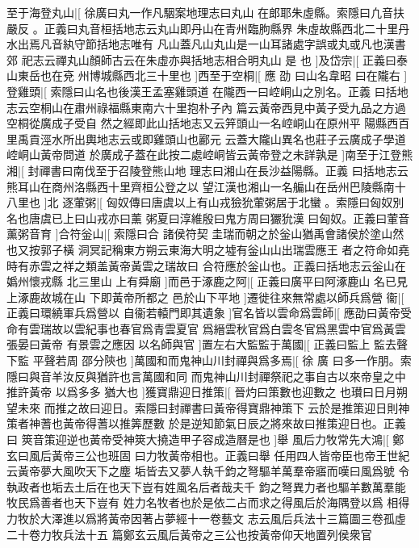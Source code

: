 %
至于海登丸山|[%
徐廣曰丸一作凡駰案地理志曰丸山%
在郎耶朱虛縣。索隱曰凢音扶嚴反%
%
。正義曰丸音桓括地志云丸山即丹山在青州臨朐縣界%
朱虛故縣西北二十里丹水出焉凡音紈守節括地志唯有%
%
凡山蓋凡山丸山是一山耳諸處字誤或丸或凡也漢書郊%
祀志云禪丸山顏師古云在朱虛亦與括地志相合明丸山%
是%
也%
]及岱宗|[%
正義曰泰山東岳也在兗%
州博城縣西北三十里也%
]西至于空桐|[%
應%
劭%
%
曰山名韋昭%
曰在隴右%
]登雞頭|[%
索隱曰山名也後漢王孟塞雞頭道%
在隴西一曰崆峒山之別名。正義%
%
曰括地志云空桐山在肅州祿福縣東南六十里抱朴子內%
篇云黃帝西見中黃子受九品之方過空桐從廣成子受自%
%
然之經即此山括地志又云笄頭山一名崆峒山在原州平%
陽縣西百里禹貢涇水所出輿地志云或即雞頭山也酈元%
%
云蓋大隴山異名也莊子云廣成子學道崆峒山黃帝問道%
於廣成子蓋在此按二處崆峒皆云黃帝登之未詳孰是%
%
]南至于江登熊湘|[%
封禪書曰南伐至于召陵登熊山地%
理志曰湘山在長沙益陽縣。正義%
%
曰括地志云熊耳山在商州洛縣西十里齊桓公登之以%
望江漢也湘山一名艑山在岳州巴陵縣南十八里也%
]北%
%
逐葷粥|[%
匈奴傳曰唐虞以上有山戎獫狁葷粥居于北蠻%
。索隱曰匈奴別名也唐虞已上曰山戎亦曰薰%
%
粥夏曰淳維殷曰鬼方周曰玁狁漢%
曰匈奴。正義曰葷音薰粥音育%
]合符釡山|[%
索隱曰合%
諸侯符契%
%
圭瑞而朝之於釡山猶禹會諸侯於塗山然也又按郭子橫%
洞冥記稱東方朔云東海大明之墟有釡山山出瑞雲應王%
%
者之符命如堯時有赤雲之祥之類盖黃帝黃雲之瑞故曰%
合符應於釡山也。正義曰括地志云釡山在嬀州懷戎縣%
%
北三里山%
上有舜廟%
]而邑于涿鹿之阿|[%
正義曰廣平曰阿涿鹿山%
名已見上涿鹿故城在山%
%
下即黃帝所都之%
邑於山下平地%
]遷徙往來無常處以師兵爲營%
%
衞|[%
正義曰環繞軍兵爲營以%
自衞若轅門即其遺象%
]官名皆以雲命爲雲師|[%
%
應劭曰黃帝受命有雲瑞故以雲紀事也春官爲青雲夏官%
爲縉雲秋官爲白雲冬官爲黑雲中官爲黃雲張晏曰黃帝%
%
有景雲之應因%
以名師與官%
]置左右大監監于萬國|[%
正義曰監上%
監去聲下監%
%
平聲若周%
邵分陝也%
]萬國和而鬼神山川封禪與爲多焉|[%
徐%
廣%
%
曰多一作朋。索隱曰與音羊汝反與猶許也言萬國和同%
而鬼神山川封禪祭祀之事自古以來帝皇之中推許黃帝%
%
以爲多多%
猶大也%
]獲寶鼎迎日推策|[%
晉灼曰策數也迎數之%
也瓉曰日月朔望未來%
%
而推之故曰迎日。索隱曰封禪書曰黃帝得寶鼎神策下%
云於是推策迎日則神策者神蓍也黃帝得蓍以推筭歷數%
%
於是逆知節氣日辰之將來故曰推策迎日也。正義曰%
筴音策迎逆也黃帝受神筴大撓造甲子容成造曆是也%
]舉%
%
風后力牧常先大鴻|[%
鄭玄曰風后黃帝三公也班固%
曰力牧黃帝相也。正義曰舉%
%
任用四人皆帝臣也帝王世紀云黃帝夢大風吹天下之塵%
垢皆去又夢人執千鈞之弩驅羊萬羣帝寤而嘆曰風爲號%
%
令執政者也垢去土后在也天下豈有姓風名后者哉夫千%
鈞之弩異力者也驅羊數萬羣能牧民爲善者也天下豈有%
%
姓力名牧者也於是依二占而求之得風后於海隅登以爲%
相得力牧於大澤進以爲將黃帝因著占夢經十一卷藝文%
%
志云風后兵法十三篇圖三卷孤虛二十卷力牧兵法十五%
篇鄭玄云風后黃帝之三公也按黃帝仰天地置列侯衆官%
